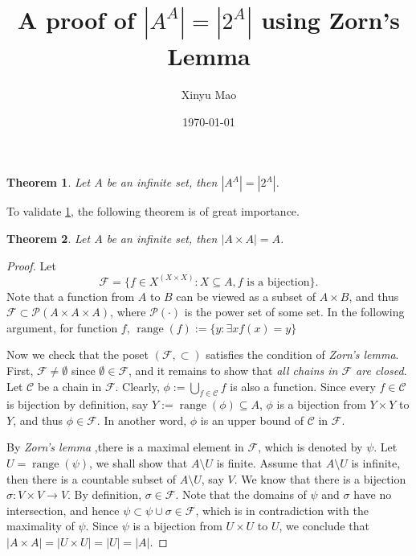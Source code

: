 \documentclass[12pt]{article}
\title{A proof of $|A^A| = |2^A| $ using Zorn's Lemma}
\author{Xinyu Mao}
\date{\today}
\theoremstyle{mythm}
\newtheorem{theorem}{Theorem}
\newcommand\cc{\mathcal{C}}
\newcommand\pp{\mathcal{P}}
\newcommand\ff{\mathcal{F}}
\DeclareMathOperator{\range}{range}
\begin{document}
\maketitle

\begin{tcolorbox}
\begin{theorem} \label{main}
    Let $A$ be an infinite set, then $|A^A| = |2^A|$.
\end{theorem}
\end{tcolorbox}
To validate \cref{main}, the following theorem is of great importance.

\begin{tcolorbox}
\begin{theorem} \label{helper}
    Let $A$ be an infinite set, then $|A \times A| = A$. 
\end{theorem}  
\end{tcolorbox}
\begin{proof}[Proof]   
    Let 
    $$
    \ff = \{f \in X^{(X \times X)} : X \subseteq A, f \text{ is a bijection}\}.
    $$
    Note that a function from $A$ to $B$ can be viewed as 
    a subset of $A \times B$, and thus $\ff \subset \pp(A \times A \times A)$,
    where $\pp(\cdot)$ is the power set of some set. 
    In the following argument, for function $f$, $\range(f) := \{y:\exists x f(x) = y\}$
    
    Now we check that the poset $(\ff, \subset)$ satisfies
    the condition of \textit{Zorn's lemma}. 
    First, $\ff \neq \emptyset$ since $\emptyset \in \ff$,
    and it remains to show that \textit{all chains in $\ff$ are closed}.
    Let $\cc$ be a chain in $\ff$. 
    Clearly, $\phi := \bigcup_{f \in \cc} f$ is also a
    function. Since every $f \in \cc$ is bijection by definition, 
    say $Y := \range(\phi) \subseteq A$, $\phi$ is a bijection from $Y \times Y$ to $Y$,
    and thus $\phi \in \ff$.
    In another word, $\phi$ is an upper bound of $\cc$ in $\ff$. 

    By \textit{Zorn's lemma} ,there is a maximal element in $\ff$,
    which is denoted by $\psi$. Let $U = \range(\psi)$, we shall
    show that $A\setminus U$ is finite. Assume that $A\setminus U$
    is infinite, then there is a countable subset of $A\setminus U$,
    say $V$. We know that there is a bijection $\sigma : V \times V \to V$.
    By definition, $\sigma \in \ff$. 
    Note that the domains of $\psi$ and $\sigma$ have no intersection, 
    and hence $\psi \subset \psi \cup \sigma \in \ff$, 
    which is in contradiction with the maximality of $\psi$.
    Since $\psi$ is a bijection from $U \times U $ to $U$,
    we conclude that $|A \times A| = |U \times U| = |U| = |A|$.
\end{proof}     
\end{document}
